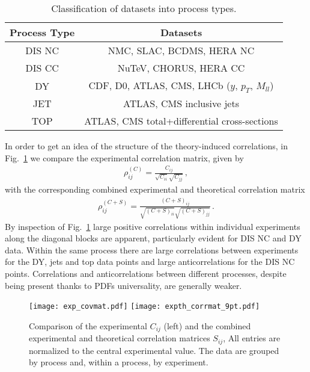     \begin{table}[t]
        \centering
        \renewcommand*{\arraystretch}{1.3}
        \begin{tabular}{|c|c|}
          \hline
          Process Type  & Datasets \\
          \hline
          DIS NC  &   NMC, SLAC, BCDMS, HERA NC \\
          DIS CC  &   NuTeV, CHORUS, HERA CC \\
          DY  & CDF, D0, ATLAS, CMS, LHCb ($y$, $p_T$, $M_{ll}$) \\
          JET  & ATLAS, CMS inclusive jets \\
          TOP  & ATLAS, CMS total+differential cross-sections \\
          \hline
        \end{tabular}
        \caption{\label{eq:expclassification}
         Classification of  datasets into  process types.
        }
    \end{table}
    In order to get an idea of the structure of the theory-induced correlations,
    in Fig.~\ref{fig:covmats} we compare the experimental correlation matrix, given by
    \begin{align}
        \rho^{(C)}_{ij} = \frac{C_{ij}}{\sqrt{C_{ii}}\sqrt{C_{jj}}}\,,
    \end{align}
    with the corresponding combined experimental and theoretical correlation matrix
    \begin{align}
        \rho^{(C+S)}_{ij} = \frac{\left(C+S\right)_{ij}}{ \sqrt{\left(C+S\right)_{ii}} \sqrt{\left(C+S\right)_{jj}} }\,.
    \end{align}
    By inspection of Fig.~\ref{fig:covmats} large positive correlations within individual experiments along 
    the diagonal blocks are apparent, particularly evident for DIS NC and DY data.
    Within the same process there are large correlations between experiments for the DY, jets and top data points 
    and large anticorrelations for the DIS NC points. Correlations and anticorrelations between different processes,
    despite being present thanks to PDFs universality, are generally weaker.

    \begin{figure}[t!]
    \begin{center}
        \texttt{[image: exp\_covmat.pdf]}
        \texttt{[image: expth\_corrmat\_9pt.pdf]}
        \caption{\small Comparison of the  experimental $C_{ij}$ (left)
        and the combined experimental and theoretical correlation matrices $S_{ij}$, 
        All entries are normalized to the central  experimental value.
        The data are grouped by process and, within a process, by experiment.} 
        \label{fig:covmats}     
    \end{center}
    \end{figure}

